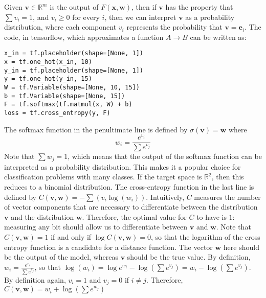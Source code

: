 \documentclass[10pt]{amsart}
\newcommand{\R}{\mathbb{R}}
\renewcommand{\v}{\mathbf{v}}
\newcommand{\w}{\mathbf{w}}
\newcommand{\x}{\mathbf{x}}
\newcommand{\e}{\mathbf{e}}
\theoremstyle{definition}
\begin{document}
Given $\v\in\R^m$ is the output of $F(\x,\w)$, then if $\v$ has the property that $\sum v_i=1$, and $v_i\geq 0$ for every $i$, then we can interpret $\v$ as a probability distribution, where each component $v_i$ represents the probability that $\v=\e_i$.  The code, in tensorflow, which approximates a function $A\to B$ can be written as:

\begin{verbatim}
x_in = tf.placeholder(shape=[None, 1])
x = tf.one_hot(x_in, 10)
y_in = tf.placeholder(shape=[None, 1])
y = tf.one_hot(y_in, 15)
W = tf.Variable(shape=[None, 10, 15])
b = tf.Variable(shape=[None, 15])
F = tf.softmax(tf.matmul(x, W) + b)
loss = tf.cross_entropy(y, F)
\end{verbatim}

The softmax function in the penultimate line is defined by $\sigma(\v) = \w$  where $$w_i= \frac{e^{v_i}}{\sum e^{v_j}}$$ Note that $\sum w_j=1$, which means that the output of the softmax function can be interpreted as a probability distribution.  This makes it a popular choice for classification problems with many classes.  If the target space is $\R^2$, then this reduces to a binomial distribution.  The cross-entropy function in the last line is defined by $C(\v, \w) = -\sum(v_i\log(w_i))$.  Intuitively, $C$ measures the number of vector components that are necessary to differentiate between the distribution $\v$ and the distribution $\w$.  Therefore, the optimal value for $C$ to have is $1$: measuring any bit should allow us to differentiate between $\v$ and $\w$.  Note that $C(\v, \w)=1$ if and only if $\log C(\v, \w)=0$, so that the logarithm of the cross entropy function is a candidate for a distance function. The vector $\w$ here should be the output of the model, whereas $\v$ should be the true value.  By definition, $w_i= \frac{e^{v_i}}{\sum e^{v_j}}$, so that $\log(w_i) = \log e^{w_i} - \log(\sum e^{v_j}) = w_i - \log(\sum e^{v_j})$. By definition again, $v_i=1$ and $v_j=0$ if $i\not=j$. Therefore, $C(\v, \w) = w_i + \log(\sum e^{w_j})$
\end{document}
